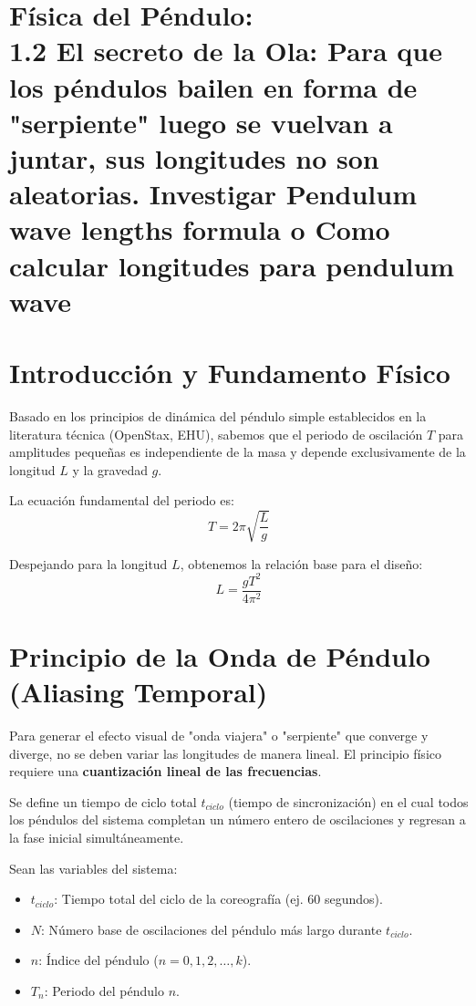 \documentclass[12pt, a4paper]{article}
\begin{document}
	
	
	
	
	
		\section*{Física del Péndulo: \\  1.2 El secreto de la Ola: Para que los péndulos bailen en forma de "serpiente" luego se vuelvan a juntar, sus longitudes no son aleatorias. Investigar Pendulum wave lengths formula o Como calcular longitudes para pendulum wave }
	
	
	\section{Introducción y Fundamento Físico}
	Basado en los principios de dinámica del péndulo simple establecidos en la literatura técnica (OpenStax, EHU), sabemos que el periodo de oscilación $T$ para amplitudes pequeñas es independiente de la masa y depende exclusivamente de la longitud $L$ y la gravedad $g$.
	
	La ecuación fundamental del periodo es:
	\begin{equation}
		T = 2\pi \sqrt{\frac{L}{g}}
	\end{equation}
	
	Despejando para la longitud $L$, obtenemos la relación base para el diseño:
	\begin{equation}
		L = \frac{g T^2}{4\pi^2}
		\label{eq:longitud_base}
	\end{equation}
	
	\section{Principio de la Onda de Péndulo (Aliasing Temporal)}
	Para generar el efecto visual de "onda viajera" o "serpiente" que converge y diverge, no se deben variar las longitudes de manera lineal. El principio físico requiere una \textbf{cuantización lineal de las frecuencias}.
	
	Se define un tiempo de ciclo total $t_{ciclo}$ (tiempo de sincronización) en el cual todos los péndulos del sistema completan un número entero de oscilaciones y regresan a la fase inicial simultáneamente.
	
	Sean las variables del sistema:
	\begin{itemize}
		\item $t_{ciclo}$: Tiempo total del ciclo de la coreografía (ej. 60 segundos).
		\item $N$: Número base de oscilaciones del péndulo más largo durante $t_{ciclo}$.
		\item $n$: Índice del péndulo ($n = 0, 1, 2, \dots, k$).
		\item $T_n$: Periodo del péndulo $n$.
	\end{itemize}
	
\end{document}
